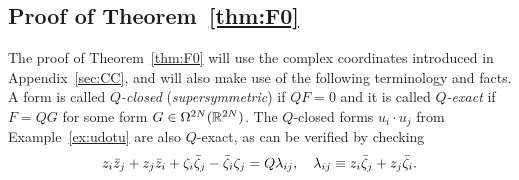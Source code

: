 \documentclass[11pt,a4paper]{article}
\begin{document}
\subsection{Proof of Theorem~\ref{thm:F0}}
\label{app:localisation}


\renewcommand{\phi}{z}
\renewcommand{\phib}{\bar z}
\renewcommand{\psi}{\zeta}
\renewcommand{\psib}{\bar \zeta}

The proof of Theorem~\ref{thm:F0} will use the complex
coordinates introduced in Appendix~\ref{sec:CC}, and will also make use of the
following terminology and facts. A form is called \emph{$Q$-closed}
(\emph{supersymmetric}) if $QF=0$ and it is called \emph{$Q$-exact} if
$F=QG$ for some form $G \in \Omega^{2N}(\mathbb{R}^{2N})$. The $Q$-closed
forms $u_{i}\cdot u_{j}$ from Example~\ref{ex:udotu} are also
$Q$-exact, as can be verified by checking
\begin{equation}
  z_i\bar z_j + z_j\bar z_i + \zeta_i\bar\zeta_j - \bar\zeta_i\zeta_j= Q\lambda_{ij}, \quad \lambda_{ij} \equiv z_i\bar\zeta_j + z_j\bar\zeta_i.
\end{equation}
\end{document}
